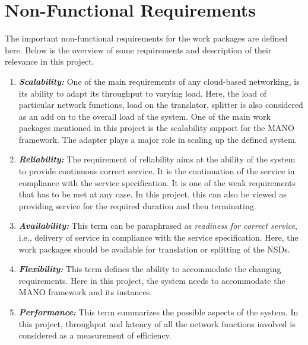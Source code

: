 \chapter{Non-Functional Requirements}
\label{ch:Non-Functional Requirements}

The important non-functional requirements for the work packages are defined here. Below is the overview of some requirements and description of their relevance in this project.


\begin{enumerate}
	\item \textit {\textbf{Scalability:}} One of the main requirements of any cloud-based networking, is its ability to adapt its throughput to varying load. Here, the load of particular network functions, load on the translator, splitter is also considered as an add on to the overall load of the system. One of the main work packages mentioned in this project is the scalability support for the MANO framework. The adapter plays a major role in scaling up the defined system.
	
	\item \textit {\textbf{Reliability:}} The requirement of reliability aims at the ability of the system to provide continuous correct service. It is the continuation of the service in compliance with the service specification. It is one of the weak requirements that has to be met at any case. In this project, this can also be viewed as providing service for the required duration and then terminating.
	
	\item \textit {\textbf{Availability:}} This term can be paraphrased as \textit {readiness for correct service}, i.e., delivery of service in compliance with the service specification. Here, the work packages should be available for translation or splitting of the NSDs.
	
	\item \textit{\textbf{Flexibility:}} This term defines the ability to accommodate the changing requirements. Here in this project, the system needs to accommodate the MANO framework and its instances. 
	
	\item \textit{\textbf{Performance:}} This term summarizes the possible aspects of the system. In this project, throughput and latency of all the network functions involved is considered as a measurement of efficiency. 
\end{enumerate}

